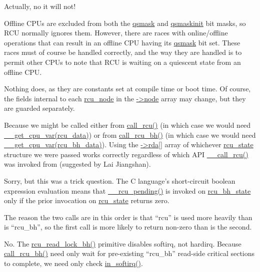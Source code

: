 	Actually, no it will not!

	Offline CPUs are excluded from both the \url{qsmask} and
	\url{qsmaskinit} bit masks, so RCU normally ignores them.
	However, there are races with online/offline operations that
	can result in an offline CPU having its \url{qsmask} bit set.
	These races must of course be handled correctly, and the way
	they are handled is to permit other CPUs to note that RCU
	is waiting on a quiescent state from an offline CPU.


	Nothing does, as they are constants set at compile time
	or boot time.
	Of course, the fields internal to each \url{rcu_node}
	in the \url{->node} array may change, but they are
	guarded separately.


	Because we might be called either from \url{call_rcu()}
	(in which case we would need \url{__get_cpu_var(rcu_data)})
	or from \url{call_rcu_bh()} (in which case we would need
	\url{__get_cpu_var(rcu_bh_data)}).
	Using the \url{->rda[]} array of whichever
	\url{rcu_state} structure we were passed works correctly
	regardless of which API \url{__call_rcu()} was invoked from
	(suggested by Lai Jiangshan).


	Sorry, but this was a trick question.
	The C language's short-circuit boolean expression evaluation
	means that \url{__rcu_pending()} is invoked on
	\url{rcu_bh_state} only if the prior invocation on
	\url{rcu_state} returns zero.

	The reason the two calls are in this order is that
	``rcu'' is used more heavily than is ``rcu\_bh'', so
	the first call is more likely to return non-zero than
	is the second.


	No.
	The \url{rcu_read_lock_bh()} primitive disables
	softirq, not hardirq.
	Because \url{call_rcu_bh()} need only wait for pre-existing
	``rcu\_bh'' read-side critical sections to complete,
	we need only check \url{in_softirq()}.

